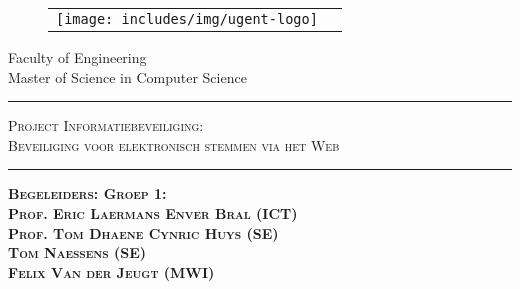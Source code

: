 \begin{titlepage}

\fontsize{12pt}{14pt}
\selectfont

\begin{center}

\begin{figure}[htb]
\centering
\renewcommand{\tabcolsep}{5pt}
\renewcommand{\arraystretch}{0}
  \begin{tabular}{@{}cc@{}}
    \texttt{[image: includes/img/ugent-logo]}
  \end{tabular}
\end{figure}

\vspace{0.5cm}

Faculty of Engineering\\
Master of Science in Computer Science\\

\vspace{3.5cm}

\fontsize{17.28pt}{21pt}
\selectfont

\hrule
\vspace{10pt}
\textsc{Project Informatiebeveiliging:\\ Beveiliging voor elektronisch stemmen via het Web}\\
\vspace{10pt}
\hrule

\vspace{25pt}

\fontsize{12pt}{14pt}
\selectfont

\vspace{6cm}

\fontsize{12pt}{14pt}
\selectfont

\hspace{0.5cm}
\textbf{ \textsc{
	Begeleiders: \hfill Groep 1:\\
	Prof. Eric Laermans \hfill Enver Bral (ICT)\\
	Prof. Tom Dhaene \hfill Cynric Huys (SE)\\
	\hfill Tom Naessens (SE)\\
	\hfill Felix Van der Jeugt (MWI)\\
}}
\end{center}
\end{titlepage}

